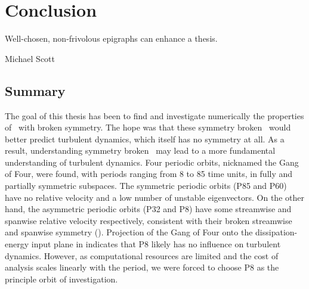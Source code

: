 \chapter*{Conclusion}
	\setcounter{chapter}{5}
	\setcounter{section}{0}
	\epigraph{
	Well-chosen, non-frivolous epigraphs can enhance a thesis.
	}{Michael Scott} 

\section{Summary}

The goal of this thesis has been to find and investigate numerically the properties of \ecs\ with broken symmetry. The hope was that these symmetry broken \ecs\ would better predict  turbulent dynamics, which itself has no symmetry at all. As a result, understanding symmetry broken \ecs\ may lead to a more fundamental understanding of turbulent dynamics. Four periodic orbits, nicknamed the Gang of Four, were found, with periods ranging from 8 to 85 time units, in fully and partially symmetric subspaces. The symmetric periodic orbits (P85 and P60) have no relative velocity and a low number of unstable eigenvectors. On the other hand, the asymmetric periodic orbits (P32 and P8) have some streamwise and spanwise relative velocity respectively, consistent with their broken streamwise and spanwise symmetry ().  Projection of the Gang of Four onto the dissipation-energy input plane in  indicates that P8 likely has no influence on turbulent dynamics. However, as computational resources are limited and the cost of analysis scales linearly with the period, we were forced to choose P8 as the principle orbit of investigation. \\ 

